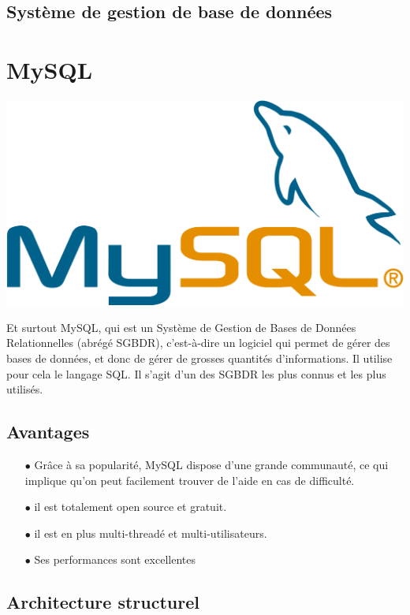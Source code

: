 			
		\subsection{Système de gestion de base de données}
		\newpage
			\section*{MySQL}
			\begin{center}
				\includegraphics[scale=0.2]{chap_2/mysql.png}
				\label{logo de MySQL}
				\cite{logo_mysql}
			\end{center}
			Et surtout MySQL, qui est un Système de Gestion de Bases de Données Relationnelles (abrégé SGBDR), c'est-à-dire un logiciel qui permet de gérer des bases de données, et donc de gérer de grosses quantités d'informations. Il utilise pour cela le langage SQL. Il s'agit d'un des SGBDR les plus connus et les plus utilisés.
			\subsection{Avantages}
				\begin{itemize}
					\item[$\bullet$] Grâce à sa popularité, MySQL dispose d'une grande communauté, ce qui implique qu'on peut facilement trouver de l'aide en cas de difficulté.
					\item[$\bullet$] il est totalement open source et gratuit.
					\item[$\bullet$] il est en plus multi-threadé et multi-utilisateurs.
					\item[$\bullet$] Ses performances sont excellentes
				\end{itemize}
			
		\subsection{Architecture structurel}
